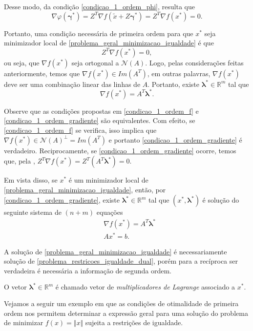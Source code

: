 \documentclass[12pt,a4paper]{scrartcl}
\def\RR{\mathds{R}}
\theoremstyle{definition}%
\begin{document}
Desse modo, da condição \eqref{condicao_1_ordem_phi}, resulta que
\[
\nabla \varphi (\boldsymbol{\gamma}^{*}) = Z^{T} \nabla f(\tilde{x} + Z\boldsymbol{\gamma}^{*}) = Z^{T} \nabla f(x^{*}) = 0 .
\]

Portanto, uma condição necessária de primeira ordem para que $x^{*}$ seja minimizador local de \eqref{problema_geral_minimizacao_igualdade} é que
\[ \label{condicao_1_ordem_f}
Z^{T} \nabla f(x^{*}) = 0,
\]
ou seja, que $\nabla f(x^{*})$ seja ortogonal a $\mathcal{N}(A)$. Logo, pelas considerações feitas anteriormente, temos que $\nabla f(x^{*}) \in Im(A^{T})$, em outras palavras, $\nabla f(x^{*})$ deve ser uma combinação linear das linhas de $A$. Portanto, existe $\boldsymbol{\lambda}^{*} \in \RR^{m}$ tal que
\[ \label{condicao_1_ordem_gradiente}
\nabla f(x^{*}) = A^{T} \boldsymbol{\lambda}^{*} .
\] 

Observe que as condições propostas em \eqref{condicao_1_ordem_f} e \eqref{condicao_1_ordem_gradiente} são equivalentes. Com efeito, se \eqref{condicao_1_ordem_f} se verifica, isso implica que $\nabla f(x^{*}) \in \mathcal{N}(A)^{\bot} = Im(A^{T})$ e portanto \eqref{condicao_1_ordem_gradiente} é verdadeiro. Reciprocamente, se \eqref{condicao_1_ordem_gradiente} ocorre, temos que, pela , $Z^{T}\nabla f(x^{*}) = Z^{T}(A^{T} \boldsymbol{\lambda}^{*}) = 0$.

Em vista disso, se $x^{*}$ é um minimizador local de \eqref{problema_geral_minimizacao_igualdade}, então, por \eqref{condicao_1_ordem_gradiente}, existe $\boldsymbol{\lambda}^{*} \in \RR^{m}$ tal que $(x^{*}, \boldsymbol{\lambda}^{*})$ é solução do seguinte sistema de $(n+m)$ equações
\[ \label{problema_restricoes_igualdade_dual}
\begin{aligned}
& \nabla f(x^{*}) = A^{T} \boldsymbol{\lambda}^{*} \\
& Ax^{*} = b .
\end{aligned}
\]

A solução de \eqref{problema_geral_minimizacao_igualdade} é necessariamente solução de \eqref{problema_restricoes_igualdade_dual}, porém para a recíproca ser verdadeira é necessária a informação de segunda ordem.

O vetor $\boldsymbol{\lambda}^{*} \in \RR^{m}$ é chamado vetor de \emph{multiplicadores de Lagrange} associado a $x^{*}$.

Vejamos a seguir um exemplo em que as condições de otimalidade de primeira ordem nos permitem determinar a expressão geral para uma solução do problema de minimizar $f(x) = \Vert x \Vert$ sujeita a restrições de igualdade.
\end{document}
